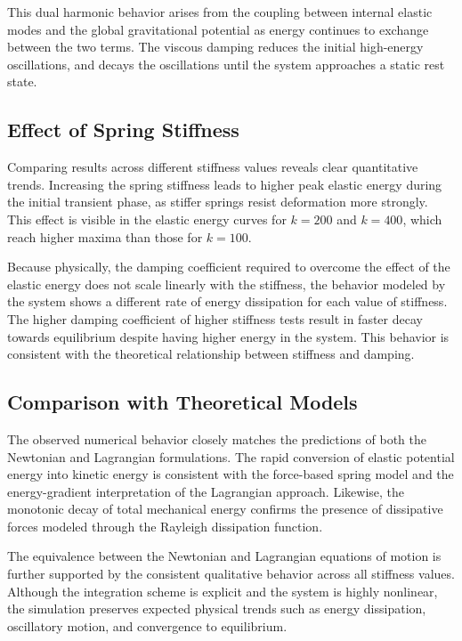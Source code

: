 \documentclass[manuscript,nonacm,12pt,letterpaper]{acmart}
\begin{document}
This dual harmonic behavior arises from the coupling between internal elastic modes and the global gravitational potential as energy continues to exchange between the two terms. The viscous damping reduces the initial high-energy oscillations, and decays the oscillations until the system approaches a static rest state.

\subsection{Effect of Spring Stiffness}
\label{Sec7.5:StiffnessEffect}

Comparing results across different stiffness values reveals clear quantitative trends. Increasing the spring stiffness leads to higher peak elastic energy during the initial transient phase, as stiffer springs resist deformation more strongly. This effect is visible in the elastic energy curves for $k = 200$ and $k = 400$, which reach higher maxima than those for $k = 100$.

Because physically, the damping coefficient required to overcome the effect of the elastic energy does not scale linearly with the stiffness, the behavior modeled by the system shows a different rate of energy dissipation for each value of stiffness. The higher damping coefficient of higher stiffness tests result in faster decay towards equilibrium despite having higher energy in the system. This behavior is consistent with the theoretical relationship between stiffness and damping.

\subsection{Comparison with Theoretical Models}
\label{Sec7.6:TheoreticalComparison}

The observed numerical behavior closely matches the predictions of both the Newtonian and Lagrangian formulations. The rapid conversion of elastic potential energy into kinetic energy is consistent with the force-based spring model and the energy-gradient interpretation of the Lagrangian approach. Likewise, the monotonic decay of total mechanical energy confirms the presence of dissipative forces modeled through the Rayleigh dissipation function.

The equivalence between the Newtonian and Lagrangian equations of motion is further supported by the consistent qualitative behavior across all stiffness values. Although the integration scheme is explicit and the system is highly nonlinear, the simulation preserves expected physical trends such as energy dissipation, oscillatory motion, and convergence to equilibrium.
\end{document}
